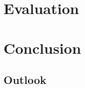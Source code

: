 \documentclass[11pt,DIV=15,BCOR=20mm,bibliography=totoc]{scrbook}
\begin{document}
\chapter{Evaluation}

\chapter{Conclusion}

\section{Outlook}

\cleardoublepage


\printbibliography
\listoffigures
\lstlistoflistings

\cleardoublepage


    
\end{document}
